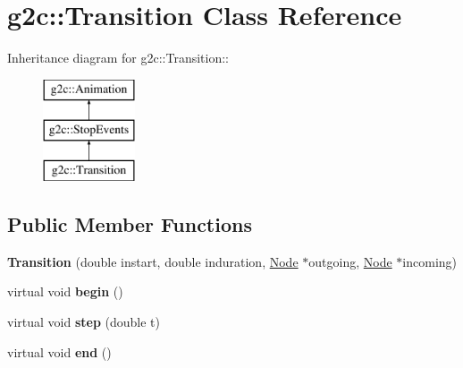 \hypertarget{classg2c_1_1_transition}{
\section{g2c::Transition Class Reference}
\label{classg2c_1_1_transition}
}
Inheritance diagram for g2c::Transition::\begin{figure}[H]
\begin{center}
\leavevmode
\includegraphics[height=3cm]{classg2c_1_1_transition}
\end{center}
\end{figure}
\subsection*{Public Member Functions}
\begin{DoxyCompactItemize}
\item 
\hypertarget{classg2c_1_1_transition_a236ef3a3da46070e0a3fedae0ece734d}{
{\bfseries Transition} (double instart, double induration, \hyperlink{classg2c_1_1_node}{Node} $\ast$outgoing, \hyperlink{classg2c_1_1_node}{Node} $\ast$incoming)}
\label{classg2c_1_1_transition_a236ef3a3da46070e0a3fedae0ece734d}

\item 
\hypertarget{classg2c_1_1_transition_a9d38f69d1a050e6f1ea46dcf1b3ca80e}{
virtual void {\bfseries begin} ()}
\label{classg2c_1_1_transition_a9d38f69d1a050e6f1ea46dcf1b3ca80e}

\item 
\hypertarget{classg2c_1_1_transition_a2f79705527b0c91591732c829488c7d8}{
virtual void {\bfseries step} (double t)}
\label{classg2c_1_1_transition_a2f79705527b0c91591732c829488c7d8}

\item 
\hypertarget{classg2c_1_1_transition_aacc901d902e303815859bd04b72be737}{
virtual void {\bfseries end} ()}
\label{classg2c_1_1_transition_aacc901d902e303815859bd04b72be737}

\end{DoxyCompactItemize}

